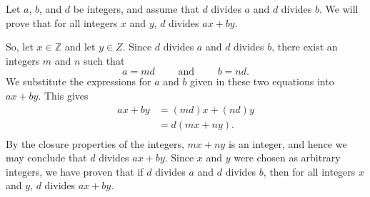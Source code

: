 \begin{enumerate}
\begin{enumerate}
\begin{myproof}
Let $a$, $b$, and  $d$  be integers, and assume that $d$  divides  $a$  and  $d$  divides  $b$.  We will prove that for all integers  $x$  and  $y$,  $d$  divides  $ax + by$.

So, let  $x \in \mathbb{Z}$ and let  $y \in Z$.  Since  $d$  divides  $a$ and $d$ divides $b$, there exist an integers  $m$ and $n$  such that
\[
a = md \qquad \text{ and } \qquad b = nd.
\]
We substitute the expressions for  $a$  and  $b$  given in these two equations into  $ax + by$.  This gives
\[
\begin{aligned}
  ax + by &= \left( {md} \right)x + \left( {nd} \right)y \\ 
          &= d\left( {mx + ny} \right). \\ 
\end{aligned} 
\]
By the closure properties of the integers,  $mx + ny$ is an integer, and hence we may conclude that  $d$  divides  $ax + by$.  Since  $x$  and  $y$  were chosen as arbitrary integers, we have proven that if  $d$  divides  $a$  and  $d$  divides  $b$, then for all integers  $x$  and  $y$,  $d$  divides  $ax + by$.
\end{myproof}


\end{enumerate}
\end{enumerate}

\hbreak




\endinput
